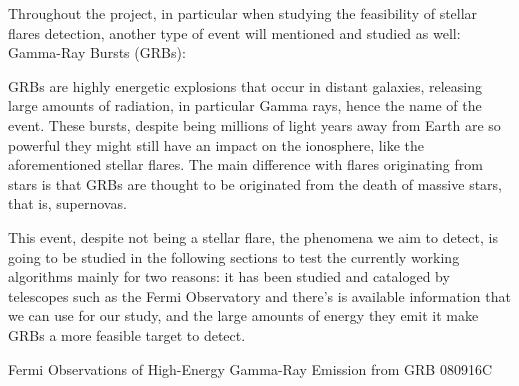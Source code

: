 Throughout the project, in particular when studying the feasibility of stellar flares detection, another type of event will mentioned and studied as well: Gamma-Ray Bursts (GRBs):

GRBs are highly energetic explosions that occur in distant galaxies, releasing large amounts of radiation, in particular Gamma rays, hence the name of the event. These bursts, despite being millions of light years away from Earth are so powerful they might still have an impact on the ionosphere, like the aforementioned stellar flares. 
The main difference with flares originating from stars is that GRBs are thought to be originated from the death of massive stars, that is, supernovas.

This event, despite not being a stellar flare, the phenomena we aim to detect, is going to be studied in the following sections to test the currently working algorithms mainly for two reasons: it has been studied and cataloged by telescopes such as the Fermi Observatory and there’s is available information that we can use for our study, and the large amounts of energy they emit it make GRBs a more feasible target to detect.

{Fermi Observations of High-Energy Gamma-Ray Emission from GRB 080916C}




